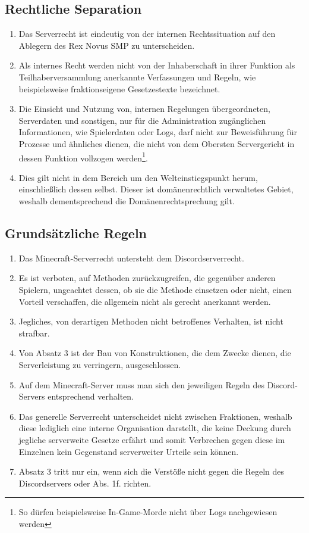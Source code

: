 \documentclass{article}
\begin{document}
\subsection{Rechtliche Separation}
\begin{enumerate}[(1)]
	\item Das Serverrecht ist eindeutig von der internen Rechtssituation auf den Ablegern des Rex Novus SMP zu unterscheiden.
	\item Als internes Recht werden nicht von der Inhaberschaft in ihrer Funktion als Teilhaberversammlung anerkannte Verfassungen und Regeln, wie beispielsweise fraktionseigene Gesetzestexte bezeichnet.
	\item Die Einsicht und Nutzung von, internen Regelungen übergeordneten, Serverdaten und sonstigen, nur für die Administration zugänglichen Informationen, wie Spielerdaten oder Logs, darf nicht zur Beweisführung für Prozesse und ähnliches dienen, die nicht von dem Obersten Servergericht in dessen Funktion vollzogen werden\footnote{So dürfen beispielsweise In-Game-Morde nicht über Logs nachgewiesen werden}.
	\item Dies gilt nicht in dem Bereich um den Welteinstiegspunkt herum, einschließlich dessen selbst. Dieser ist domänenrechtlich verwaltetes Gebiet, weshalb dementsprechend die Domänenrechtsprechung gilt.
\end{enumerate}

\subsection{Grundsätzliche Regeln}
\begin{enumerate}[(1)]
	\item Das Minecraft-Serverrecht untersteht dem Discordserverrecht.
	\item Es ist verboten, auf Methoden zurückzugreifen, die gegenüber anderen Spielern, ungeachtet dessen, ob sie die Methode einsetzen oder nicht, einen Vorteil verschaffen, die allgemein nicht als gerecht anerkannt werden.
	\item Jegliches, von derartigen Methoden nicht betroffenes Verhalten, ist nicht strafbar.
	\item Von Absatz 3 ist der Bau von Konstruktionen, die dem Zwecke dienen, die Serverleistung zu verringern, ausgeschlossen.
	\item Auf dem Minecraft-Server muss man sich den jeweiligen Regeln des Discord-Servers entsprechend verhalten.
	\item Das generelle Serverrecht unterscheidet nicht zwischen Fraktionen, weshalb diese lediglich eine interne Organisation darstellt, die keine Deckung durch jegliche serverweite Gesetze erfährt und somit Verbrechen gegen diese im Einzelnen kein Gegenstand serverweiter Urteile sein können.
	\item Absatz 3 tritt nur ein, wenn sich die Verstöße nicht gegen die Regeln des Discordservers oder Abs. 1f. richten.
\end{enumerate}
\end{document}
